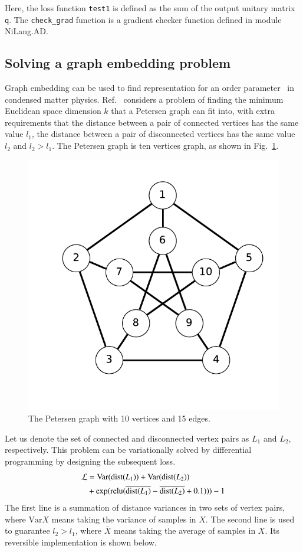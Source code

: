 \documentclass[aps,twocolumn,longbibliography,english,superscriptaddress]{revtex4-1}
\newcommand{\<}{\langle}
\renewcommand{\>}{\rangle}
\newcommand{\Var}{{\mathrm{Var}}}
\newcommand{\Fig}[1]{Fig.~\ref{#1}}
\newcommand{\Ref}[1]{Ref.~\onlinecite{#1}}
\theoremstyle{definition}\newtheorem{definition}{\textit{Definition}}
\begin{document}
Here, the loss function \texttt{test1} is defined as the sum of the output unitary matrix \texttt{q}. The \texttt{check\_grad} function is a gradient checker function defined in module NiLang.AD.

\subsection{Solving a graph embedding problem}\label{sec:graph}
Graph embedding can be used to find representation for an order parameter~\cite{Takahashi2020} in condensed matter physics.
\Ref{Takahashi2020} considers a problem of finding the minimum Euclidean space dimension $k$ that a Petersen graph can fit into, with extra requirements that the distance between a pair of connected vertices has the same value $l_1$, the distance between a pair of disconnected vertices has the same value $l_2$ and $l_2 > l_1$.
The Petersen graph is ten vertices graph, as shown in \Fig{fig:petersen}.\begin{figure}
    \centerline{\includegraphics[width=0.6\columnwidth,trim={0 1cm 0 0},clip]{images/petersen.pdf}}
    \caption{The Petersen graph with 10 vertices and 15 edges.}\label{fig:petersen}
\end{figure}
Let us denote the set of connected and disconnected vertex pairs as $L_1$ and $L_2$, respectively. This problem can be variationally solved by differential programming by designing the subsequent loss.
\begin{align}
    \begin{split}
        \mathcal{L} &= \Var({\rm dist}(L_1)) + \Var({\rm dist}(L_2)) \\
        &+\exp({\rm relu}(\overline{{\rm dist}(L_1)} - \overline{{\rm dist}(L_2)} + 0.1))) - 1
    \end{split}
\end{align}
The first line is a summation of distance variances in two sets of vertex pairs, where $\Var{X}$ means taking the variance of samples in $X$.
The second line is used to guarantee $l_2 > l_1$, where $\overline{X}$ means taking the average of samples in $X$.
Its reversible implementation is shown below.
\end{document}
